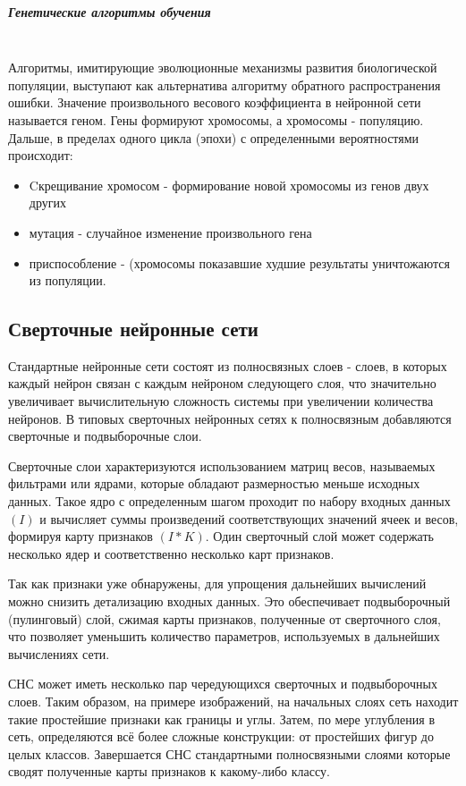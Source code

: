 \subparagraph{Генетические алгоритмы обучения}\mbox{} \\
 Алгоритмы, имитирующие эволюционные механизмы развития биологической популяции, выступают как альтернатива алгоритму обратного распространения ошибки. Значение произвольного весового коэффициента в нейронной сети называется геном. Гены формируют хромосомы, а хромосомы - популяцию. Дальше, в пределах одного цикла (эпохи) с определенными вероятностями происходит: 
 \begin{itemize}
     \item Cкрещивание хромосом - формирование новой хромосомы из генов двух других
     \item мутация - случайное изменение произвольного гена
     \item приспособление - (хромосомы показавшие худшие результаты уничтожаются из популяции.
 \end{itemize}

\subsection{Сверточные нейронные сети}
Стандартные нейронные сети состоят из полносвязных слоев - слоев, в которых каждый нейрон связан с каждым нейроном следующего слоя, что значительно увеличивает вычислительную сложность системы при увеличении количества нейронов. 
В типовых сверточных нейронных сетях к полносвязным добавляются сверточные и подвыборочные слои. 

Сверточные слои характеризуются использованием матриц весов, называемых фильтрами или ядрами, которые обладают размерностью меньше исходных данных. Такое ядро с определенным шагом проходит по набору входных данных $(I)$ и вычисляет суммы произведений соответствующих значений ячеек и весов, формируя карту признаков $(I * K)$. Один сверточный слой может содержать несколько ядер и соответственно несколько карт признаков.



Так как признаки уже обнаружены, для упрощения дальнейших вычислений можно снизить детализацию входных данных. Это обеспечивает подвыборочный (пулинговый) слой, сжимая карты признаков, полученные от сверточного слоя, что позволяет уменьшить количество параметров, используемых в дальнейших вычислениях сети. 

СНС может иметь несколько пар чередующихся сверточных и подвыборочных слоев. 
Таким образом, на примере изображений, на начальных слоях сеть находит такие простейшие признаки как границы и углы. Затем, по мере углубления в сеть, определяются всё более сложные конструкции: от простейших фигур до целых классов. Завершается СНС стандартными полносвязными слоями которые сводят полученные карты признаков к какому-либо классу.  

